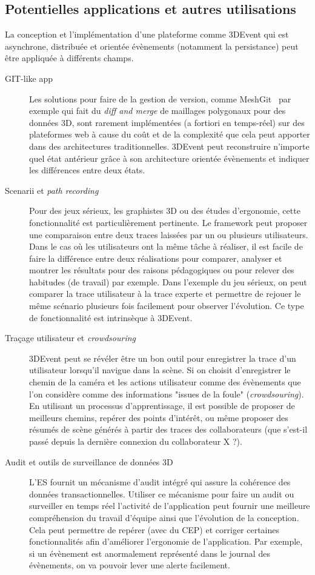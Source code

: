 \subsection{Potentielles applications et autres utilisations}
La conception et l'implémentation d'une plateforme comme 3DEvent qui est 
asynchrone, distribuée et orientée évènements  (notamment la persistance) peut 
être appliquée à différents champs.
\begin{description}
	\item[GIT-like app] Les solutions pour faire de la gestion de version, comme 
	MeshGit~\cite{Denning2013} par exemple qui fait du
	\textit{diff and merge} de maillages polygonaux pour des données 3D, 
	sont rarement implémentées (a fortiori en 
	temps-réel) sur des plateformes web à cause du coût et de la complexité que 
	cela peut apporter dans des architectures traditionnelles. 3DEvent peut 
	reconstruire n'importe quel état antérieur grâce à son architecture orientée 
	évènements et indiquer les différences entre deux états.
	
	\item[Scenarii et \textit{path recording}] Pour des jeux sérieux, les graphistes 
	3D ou des études d'ergonomie, cette fonctionnalité est particulièrement 
	pertinente. Le \gls{framework} peut proposer une comparaison entre deux traces 
	laissées par un ou plusieurs utilisateurs. Dans le cas où les utilisateurs ont la 
	même tâche à réaliser, il est facile de faire la différence entre deux réalisations 
	pour comparer, analyser et montrer les résultats	pour des raisons 
	pédagogiques ou pour relever des habitudes (de travail) par exemple. Dans 
	l'exemple du jeu sérieux, on peut comparer la trace utilisateur à la trace experte 
	et permettre de rejouer le même scénario plusieurs fois facilement pour 
	observer l'évolution. Ce type de fonctionnalité est intrinsèque à 3DEvent. 
	
	\item[Traçage utilisateur et \textit{crowdsouring}] 3DEvent peut se révéler être 
	un bon outil pour enregistrer la trace d'un utilisateur lorsqu'il navigue dans la 
	scène. Si on choisit d'enregistrer le chemin de la caméra et les actions 
	utilisateur comme des évènements que l'on considère comme des informations 
	"issues de la foule" (\textit{crowdsouring}). En utilisant un processus 
	d'apprentissage, il est possible de proposer de meilleurs chemins, repérer des 
	points d'intérêt, ou même proposer des résumés de scène générés à partir des 
	traces des collaborateurs (que s'est-il passé depuis la dernière connexion du 
	collaborateur X ?).
	\item[Audit et outils de surveillance de données 3D] L'\gls{ES} fournit un 
	mécanisme 
	d'audit intégré qui assure la cohérence des données transactionnelles. Utiliser 
	ce mécanisme pour faire un audit ou surveiller en temps réel l'activité de 
	l'application peut fournir une meilleure compréhension du travail d'équipe ainsi 
	que l'évolution de la conception. Cela peut permettre de repérer (avec du 
	\gls{CEP}) et corriger certaines fonctionnalités afin d'améliorer l'ergonomie de 
	l'application. Par exemple, si un évènement est anormalement représenté dans 
	le journal des évènements, on va pouvoir lever une alerte facilement.
\end{description}
